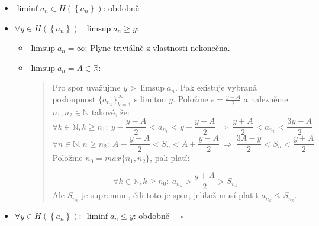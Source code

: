 \documentclass[12pt]{article}
\begin{document}
\begin{itemize}
\begin{itemize}
\begin{quote}
          Konstruujme indukčně posloupnost $\{a_{n_k}\}$:
          \begin{itemize}
            \item Položme $\epsilon = 1, n=1$ a podle (*) nalezněme $n_1\in\mathbb{N}, n_1>1$ takové, že $A-1 < a_{n_1} < A+1$.
            \item Pro $n_k$ předpokládejme, že máme již zvolené $n_{k-1}$. Položme $\epsilon = \frac{1}{k}, n = n_{k-1}$.
              Podle (*) nalezněme $n_k\in\mathbb{N}, n_k>n_{k-1}$ splňující $A-\frac{1}{k} < a_{n_k} < A+\frac{1}{k}$.
          \end{itemize}

          Pak pro libovolně zvolený $\epsilon \in \mathbb{R}^+$ nalezněme $k_0 > \frac{1}{\epsilon}$,
          pak platí:
          \[ \forall k\in\mathbb{N}, k\geq k_0:\ |a_{n_k} - A| < \frac{1}{k} \leq \frac{1}{k_0} < \epsilon \]

          A tedy z definice platí, že limita posloupnosti $\{a_{n_k}\}$ je rovna $A$.
        \end{quote}
    \end{itemize}
  \item $\liminf a_n \in H\left(\left\{a_n\right\}\right)$: obdobně
  \item $\forall y \in H\left(\left\{a_n\right\}\right) :\ \limsup a_n \geq y$:
    \begin{itemize}
      \item $\limsup a_n = \infty$: Plyne triviálně z vlastnosti nekonečna.
      \item $\limsup a_n = A \in \mathbb{R}$:
        \begin{quote}
          Pro spor uvažujme $y > \limsup a_n$. Pak existuje vybraná posloupnost $\{a_{n_k}\}_{k=1}^\infty$
          s limitou $y$. Položme $\epsilon = \frac{y-A}{2}$ a nalezněme $n_1,n_2 \in\mathbb{N}$ takové, že:
          \[ \forall k\in\mathbb{N}, k\geq n_1:\ y- \frac{y-A}{2} < a_{n_k} < y+ \frac{y-A}{2} \ \Rightarrow \ \frac{y+A}{2} < a_{n_k} < \frac{3y-A}{2} \]
          \[ \forall n\in\mathbb{N}, n\geq n_2:\ A- \frac{y-A}{2} < S_n < A+ \frac{y-A}{2} \ \Rightarrow \ \frac{3A-y}{2} < S_n < \frac{y+A}{2} \]
          Položme $n_0 = max\{n_1,n_2\}$, pak platí:

          \[ \forall k\in\mathbb{N}, k\geq n_0:\ a_{n_k} > \frac{y+A}{2} > S_{n_k}\]
          Ale $S_{n_k}$ je supremum, čili toto je spor, jelikož musí platit $a_{n_k} \leq S_{n_k}$.
        \end{quote} 
    \end{itemize}
  \item $\forall y \in H\left(\left\{a_n\right\}\right) :\ \liminf a_n \leq y$: obdobně $\quad \square$
\end{itemize}
\end{document}
